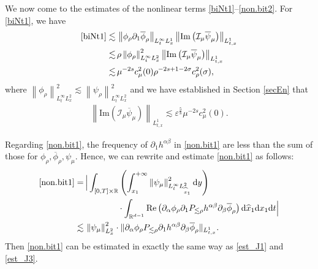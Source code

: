 \documentclass[11pt,letterpaper,reqno]{amsart}
\numberwithin{equation}{section}
\theoremstyle{definition}
\theoremstyle{remark}
\begin{document}
We now come to the  estimates of the nonlinear terms \eqref{biNt1}--\eqref{non.bit2}.
For \eqref{biNt1}, we have 
\begin{align*}
    \eqref{biNt1} \lesssim&\, \left\|\phi_{\rho } \partial_{1} \overline{\phi}_\rho \right\|_{L^\infty_tL^1_x }  \left\|\mathrm{Im} \left(  \mathcal{I}_\mu \overline{ \psi}_\mu\right) \right\|_{L^1_{t,x}}\\
    \lesssim &\,  \rho \left\|\phi_{\rho } \right\|_{L^\infty_t L^2_x }^2  \left\|\mathrm{Im} \left(  \mathcal{I}_\mu \overline{ \psi}_\mu\right) \right\|_{L^1_{t,x}} \\
    \lesssim &\, \mu ^{-2s} c_\mu ^2(0)  \rho^{-2s+1-2\sigma} c_\rho^2(\sigma),
\end{align*}
where 
 \( \left\|\phi_{\rho } \right\|_{L^\infty_t L^2_x }^2 \lesssim \left\|\psi_{\rho } \right\|_{L^\infty_tL^2_x }^2 \)
 and  we have established in Section \ref{secEn} that
 \begin{align*}
 \left\|\mathrm{Im} \left(  \mathcal{I}_\mu \overline{ \psi}_\mu\right) \right\|_{L^1_{t,x}}   \lesssim  \varepsilon^{\frac 58} \mu ^{-2s} c_\mu ^2(0).
 \end{align*}

 

Regarding \eqref{non.bit1},   the frequency  of $ \partial_1  h^{\alpha \beta}  $ in \eqref{non.bit1} are less than  the sum of those for $ \phi_\rho , \overline{\phi}_\rho, \psi_\mu.  $ Hence, we can rewrite and estimate \eqref{non.bit1} as follows:  
\begin{align*}
	 \eqref{non.bit1} =&\,\Big|\int_{[0,T]\times \mathbb{R}}  \left( \int^{+\infty}_{x_1}   \left\|\psi_\mu\right\|^2_{L^\infty_t L^2_{\widehat{x}_1}}   \mathrm{ d} y\right )\nonumber\\
 &\qquad \qquad \cdot\int_{\mathbb{R}^{d-1}}  \mathrm{Re}\left(\partial_{\alpha} \phi_\rho   \partial_1 P_{\lesssim \rho}h^{\alpha \beta} \partial_\beta \overline{\phi}_{\rho}\right)  \mathrm{d} \widehat{x}_1\mathrm{ d} x_1 \mathrm{ d} t \Big|\\
	 \lesssim &\, \left\|\psi_\mu\right\|_{L^2_{x}}^2 \cdot \|\partial_{\alpha} \phi_\rho   P_{\lesssim \rho}\partial_1 h^{\alpha \beta} \partial_\beta \overline{\phi}_{\rho} \|_{L^1_{t,x}}.
\end{align*}
Then \eqref{non.bit1} can be estimated in exactly the same way as \eqref{est_J1} and \eqref{est_J3}.
\end{document}

